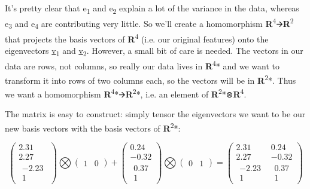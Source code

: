 \documentclass[oneside,english]{amsbook}
\numberwithin{section}{chapter}
\theoremstyle{plain}
\theoremstyle{definition}
\begin{document}
It's pretty clear that e\textsubscript{1} and e\textsubscript{2} explain
a lot of the variance in the data, whereas e\textsubscript{3} and
e\textsubscript{4} are contributing very little. So we'll create a
homomorphism \textbf{R}\textsuperscript{4}🡪\textbf{R}\textsuperscript{2}
that projects the basis vectors of \textbf{R}\textsuperscript{4} (i.e.
our original features) onto the eigenvectors ­\ul{v}\textsubscript{1} and
\ul{v}\textsubscript{2}. However, a small bit of care is needed. The
vectors in our data are rows, not columns, so really our data lives in
\textbf{R}\textsuperscript{4}* and we want to transform it into rows of
two columns each, so the vectors will be in
\textbf{R}\textsuperscript{2}*. Thus we want a homomorphism
\textbf{R}\textsuperscript{4}*🡪\textbf{R}\textsuperscript{2}*, i.e. an
element of \textbf{R}\textsuperscript{2}*⊗\textbf{R}\textsuperscript{4}.

The matrix is easy to construct: simply tensor the eigenvectors we want
to be our new basis vectors with the basis vectors of
\textbf{R}\textsuperscript{2}*:

\[\begin{pmatrix}
	2.31 \\
	2.27 \\
	\begin{matrix}
		- 2.23 \\
		1
	\end{matrix}
\end{pmatrix}\bigotimes\begin{pmatrix}
	1 & 0
\end{pmatrix} + \begin{pmatrix}
	0.24 \\
	- 0.32 \\
	\begin{matrix}
		0.37 \\
		1
	\end{matrix}
\end{pmatrix}\bigotimes\begin{pmatrix}
	0 & 1
\end{pmatrix} = \begin{pmatrix}
	2.31 & 0.24 \\
	2.27 & - 0.32 \\
	\begin{matrix}
		- 2.23 \\
		1
	\end{matrix} & \begin{matrix}
		0.37 \\
		1
	\end{matrix}
\end{pmatrix}\]
\end{document}

